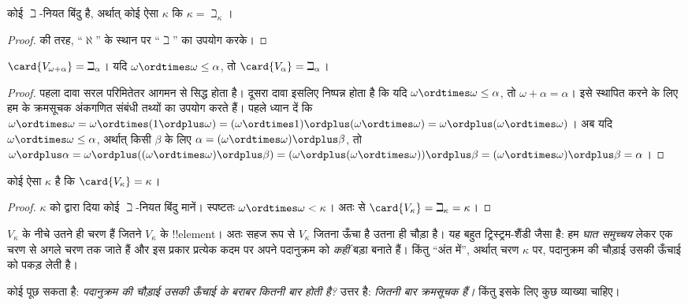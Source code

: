 \documentclass[../../../include/open-logic-section]{subfiles}
\begin{document}
\begin{prop}
कोई $\beth$-नियत बिंदु है, अर्थात् कोई ऐसा $\kappa$ कि
$\kappa=\beth_\kappa$।
\end{prop}

\begin{proof}
 की तरह, ``$\aleph$'' के स्थान पर ``$\beth$'' का उपयोग
करके।
\end{proof}

\begin{prop}
$\card{V_{\omega+\alpha}}=\beth_{\alpha}$। यदि
$\omega\ordtimes\omega\leq\alpha$, तो $\card{V_\alpha}=\beth_\alpha$।
\end{prop}

\begin{proof}
पहला दावा सरल परिमितेतर आगमन से सिद्ध होता है। दूसरा दावा इसलिए निष्पन्न
होता है कि यदि $\omega\ordtimes\omega\leq\alpha$, तो
$\omega+\alpha=\alpha$। इसे स्थापित करने के लिए हम
 के क्रमसूचक अंकगणित संबंधी तथ्यों का उपयोग
करते हैं। पहले ध्यान दें कि
$\omega\ordtimes\omega=\omega\ordtimes(1\ordplus\omega)=
(\omega\ordtimes1)\ordplus(\omega\ordtimes\omega)=
\omega\ordplus(\omega\ordtimes\omega)$। अब यदि
$\omega\ordtimes\omega\leq\alpha$, अर्थात् किसी $\beta$ के लिए
$\alpha=(\omega\ordtimes\omega)\ordplus\beta$, तो
$\omega\ordplus\alpha=\omega\ordplus((\omega\ordtimes\omega)\ordplus
\beta)=(\omega\ordplus(\omega\ordtimes\omega))\ordplus\beta=
(\omega\ordtimes\omega)\ordplus\beta=\alpha$।
\end{proof}

\begin{cor}
कोई ऐसा $\kappa$ है कि $\card{V_\kappa}=\kappa$।
\end{cor}

\begin{proof}
$\kappa$ को  द्वारा दिया कोई $\beth$-नियत बिंदु मानें।
स्पष्टतः $\omega\ordtimes\omega<\kappa$। अतः  से
$\card{V_\kappa}=\beth_\kappa=\kappa$।
\end{proof}

$V_\kappa$ के नीचे उतने ही चरण हैं जितने $V_\kappa$ के !!{element}। अतः
सहज रूप से $V_\kappa$ जितना ऊँचा है उतना ही चौड़ा है। यह बहुत
ट्रिस्ट्रम-शैंडी जैसा है: हम \emph{घात समुच्चय} लेकर एक चरण से अगले चरण तक
जाते हैं और इस प्रकार प्रत्येक कदम पर अपने पदानुक्रम को \emph{कहीं} बड़ा
बनाते हैं। किंतु ``अंत में'', अर्थात् चरण $\kappa$ पर, पदानुक्रम की चौड़ाई
उसकी ऊँचाई को पकड़ लेती है।

कोई पूछ सकता है: \emph{पदानुक्रम की चौड़ाई उसकी ऊँचाई के बराबर कितनी बार
होती है?} उत्तर है: \emph{जितनी बार क्रमसूचक हैं।} किंतु इसके लिए कुछ
व्याख्या चाहिए।
\end{document}
